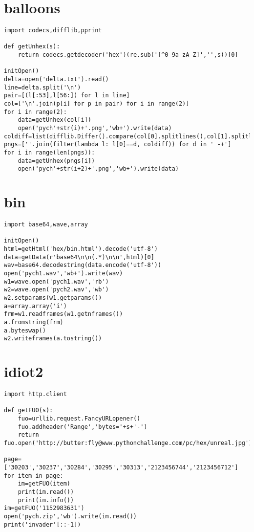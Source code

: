 \documentclass[onecolumn,a4paper,12pt]{article}
\begin{document}
\section{balloons}
\begin{lstlisting}
import codecs,difflib,pprint

def getUnhex(s):
    return codecs.getdecoder('hex')(re.sub('[^0-9a-zA-Z]','',s))[0]

initOpen()
delta=open('delta.txt').read()
line=delta.split('\n')
pair=[(l[:53],l[56:]) for l in line]
col=['\n'.join(p[i] for p in pair) for i in range(2)]
for i in range(2):
    data=getUnhex(col[i])
    open('pych'+str(i)+'.png','wb+').write(data)
coldiff=list(difflib.Differ().compare(col[0].splitlines(),col[1].splitlines()))
pngs=[''.join(filter(lambda l: l[0]==d, coldiff)) for d in ' -+']
for i in range(len(pngs)):
    data=getUnhex(pngs[i])
    open('pych'+str(i+2)+'.png','wb+').write(data)
\end{lstlisting}

\section{bin}
\begin{lstlisting}
import base64,wave,array

initOpen()
html=getHtml('hex/bin.html').decode('utf-8')
data=getData(r'base64\n\n(.*)\n\n',html)[0]
wav=base64.decodestring(data.encode('utf-8'))
open('pych1.wav','wb+').write(wav)
w1=wave.open('pych1.wav','rb')
w2=wave.open('pych2.wav','wb')
w2.setparams(w1.getparams())
a=array.array('i')
frm=w1.readframes(w1.getnframes())
a.fromstring(frm)
a.byteswap()
w2.writeframes(a.tostring())
\end{lstlisting}

\section{idiot2}
\begin{lstlisting}
import http.client

def getFUO(s):
    fuo=urllib.request.FancyURLopener()
    fuo.addheader('Range','bytes='+s+'-')
    return fuo.open('http://butter:fly@www.pythonchallenge.com/pc/hex/unreal.jpg')

page=['30203','30237','30284','30295','30313','2123456744','2123456712']
for item in page:
    im=getFUO(item)
    print(im.read())
    print(im.info())
im=getFUO('1152983631')
open('pych.zip','wb').write(im.read())
print('invader'[::-1])
\end{lstlisting}
\end{document}
